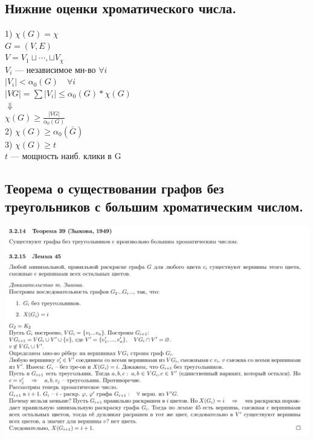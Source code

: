 \documentclass[12pt]{article}
\begin{document}
\subsection{Нижние оценки хроматического числа.}
	1) $\chi(G) = \chi$\\
	$G = (V, E)$\\
	$V = V_1 \sqcup \dotsb, \sqcup V_\chi$\\
	$V_i$ — независимое мн-во $\forall i$\\
	$|V_i| < \alpha_0(G) \quad \forall i$\\
	$|VG| = \sum|V_i| \leqslant \alpha_0(G) * \chi(G)$\\
	$\Downarrow$\\
	$\chi(G) \geqslant \frac{|VG|}{\alpha_0(G)}$\\
	2) $\chi(G) \geqslant \alpha_0(\bar{G})$\\
	3) $\chi(G) \geqslant t$\\
	$t$ — мощность наиб. клики в G\\
\subsection{Теорема о существовании графов без треугольников с большим хроматическим числом.}
	\includegraphics[width=600pt]{11}
\end{document}
